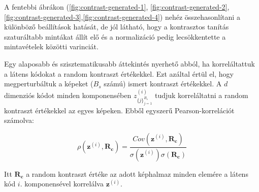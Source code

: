 \documentclass[12pt, english]{article}
\begin{document}
\par A fentebbi ábrákon (\ref{fig:contrast-generated-1}, \ref{fig:contrast-generated-2}, \ref{fig:contrast-generated-3},\ref{fig:contrast-generated-4}) nehéz összehasonlítani a különböző beállítások hatását, de jól látható, hogy a kontrasztos tanítás szaturáltabb mintákat állít elő és a normalizáció pedig lecsökkentette a mintavételek közötti varinciát.

\vspace{4mm}

\par Egy alaposabb és szisztematikusabb áttekintés nyerhető abból, ha korreláltattuk a látens kódokat a random kontraszt értékekkel. Ezt azáltal értül el, hogy megperturbáltuk a képeket ($B_{s}$ számú) ismert kontraszt értékekkel. A $d$ dimenziós kódot minden komponensében $z^{(i)}_{\{j\}_{j = 1}^{B_{s}}}$ tudjuk korreláltatni a random kontraszt értékekkel az egyes képeken. Ebből egyszerű Pearson-korrelációt számolva:

\vspace{4mm}

\begin{equation*}
    \rho(\bm{z}^{(i)}, \bm{R_{c}}) = \frac{Cov(\bm{z}^{(i)}, \bm{R_{c}})}{\sigma(\bm{z}^{(i)})\sigma(\bm{R_{c}})}  
\end{equation*}

\vspace{4mm}



\par Itt $\bm{R_{c}}$ a random kontraszt értéke az adott képhalmaz minden elemére a látens kód $i.$ komponensével korrelálva $\bm{z}^{(i)}$.

\vspace{4mm}
\end{document}
